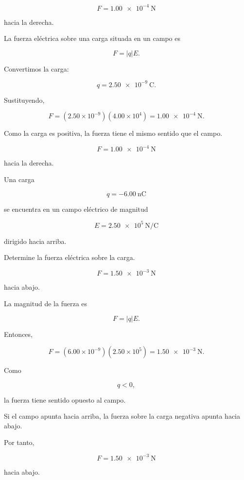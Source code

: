 \begin{respuesta}

\[
\boxed{F=\SI{1.00e-4}{\newton}}
\]

hacia la derecha.

\end{respuesta}

\begin{explicacion}

La fuerza eléctrica sobre una carga situada en un campo es

\[
F=|q|E.
\]

Convertimos la carga:

\[
q=\SI{2.50e-9}{\coulomb}.
\]

Sustituyendo,

\[
F=(2.50\times10^{-9})(4.00\times10^4)
=\SI{1.00e-4}{\newton}.
\]

Como la carga es positiva, la fuerza tiene el mismo sentido que el campo.

\[
\boxed{F=\SI{1.00e-4}{\newton}}
\]

hacia la derecha.

\end{explicacion}


\begin{ejercicio}

Una carga

\[
q=-\SI{6.00}{\nano\coulomb}
\]

se encuentra en un campo eléctrico de magnitud

\[
E=\SI{2.50e5}{\newton\per\coulomb}
\]

dirigido hacia arriba.

Determine la fuerza eléctrica sobre la carga.

\end{ejercicio}

\begin{respuesta}

\[
\boxed{F=\SI{1.50e-3}{\newton}}
\]

hacia abajo.

\end{respuesta}

\begin{explicacion}

La magnitud de la fuerza es

\[
F=|q|E.
\]

Entonces,

\[
F=(6.00\times10^{-9})(2.50\times10^5)
=\SI{1.50e-3}{\newton}.
\]

Como

\[
q<0,
\]

la fuerza tiene sentido opuesto al campo.

Si el campo apunta hacia arriba, la fuerza sobre la carga negativa apunta hacia abajo.

Por tanto,

\[
\boxed{F=\SI{1.50e-3}{\newton}}
\]

hacia abajo.

\end{explicacion}


